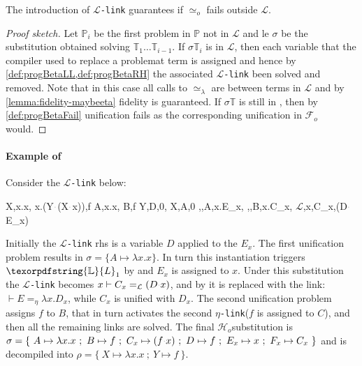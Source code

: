 \documentclass[sigconf,natbib=false,review]{acmart}
\newcommand{\appsep}{\ensuremath{\textcolor{lightgray}{\cdot}}}
\newcommand{\UnifRel}{\ensuremath{\simeq}}
\newcommand{\Uo}{\texorpdfstring{\ensuremath{\UnifRel_o}\xspace}{unif\_o}}
\newcommand{\Ue}{\ensuremath{\UnifRel_\lambda}\xspace}
\newcommand{\llambda}{\ensuremath{\mathcal{L}}\xspace}
\newcommand{\linkMacro}[1]{\ensuremath{#1}\texttt{-link}\xspace}
\newcommand{\linkbeta}{\linkMacro{\llambda}}
\newcommand{\linketa} {\linkMacro{\eta}}
\newcommand{\Fo}{\texorpdfstring{\ensuremath{\mathcal{F}_{\!o}\xspace}}{Fo}} %
\newcommand{\Ho}{\texorpdfstring{\ensuremath{\mathcal{H}_o}\xspace}{Ho}}
\newcommand{\linketaM}[3]{\ensuremath{#1 \vdash #2 =_\eta #3}}
\newcommand{\linkbetaM}[3]{\ensuremath{#1 \vdash #2 =_{\llambda} #3}}
\newcommand{\rhs}{rhs\xspace}
\newcommand{\linkStore}{\texorpdfstring{\ensuremath{\mathbb{L}}\xspace}{L}}
\newcommand{\foUnifPb}{\ensuremath{\mathbb{P}}\xspace}
\newcommand{\hoUnifPb}{\ensuremath{\mathbb{T}}\xspace}
\begin{document}

\begin{theorem}[Fidelity with \linkbeta]
  The introduction of \linkbeta guarantees 
  if \Uo{} fails outside \llambda.
\end{theorem}

\begin{proof}[Proof sketch]
  Let $\foUnifPb_i$ be the first problem in \foUnifPb not in \llambda and
  le $\sigma$ be the substitution obtained solving $\hoUnifPb_1\ldots\hoUnifPb_{i-1}$.
  If $\sigma\hoUnifPb_i$ is in \llambda, then each variable that the
  compiler used to replace a problemat term is assigned and hence
  by \cref{def:progBetaLL,def:progBetaRH} the associated \linkbeta
  been solved and removed. Note that in this case all
  calls to \Ue{} are between terms in \llambda and by \cref{lemma:fidelity-maybeeta}
  fidelity is guaranteed. If $\sigma\hoUnifPb$ is still in \notllambda,
  then by \cref{def:progBetaFail} unification fails as the
  corresponding unification in \Fo{} would.
\end{proof}

\paragraph{Example of \progBetaLL}
Consider the \linkbeta below:

\printAlll
  {{{X,\lambda x.x},
    {\lambda x.(Y\appsep (X\appsep x)),f}}}
  {{{A,\lambda x.x},
    {B,f}}}
  {{{Y,D,0},
    {X,A,0}}}
  {{{\eta,,A,\lambda x.E_{x}},
    {\eta,,B,\lambda x.C_{x}},
    {\llambda,x,C_{x},(D\appsep E_{x})}}}

\noindent
Initially the \linkbeta \rhs is a variable $D$ applied to the $E_x$.
The first unification problem results in $\sigma =
\{A \mapsto \lambda x.x\}$. In turn this instantiation
triggers $\linkStore_1$ by \progressetaleft 
and $E_x$ is assigned to $x$.
Under this substitution the \linkbeta becomes
\linkbetaM{x}{C_x}{(D \appsep x)}, and by \progBetaLL
it is replaced with the link:
\linketaM{}{E}{\lambda x.D_x}, while $C_x$ is unified with $D_x$. The second unification
problem assigns $f$ to $B$, that in turn activates
the second \linketa ($f$ is assigned to $C$), and then all the remaining links
are solved. The final \Ho substitution is $\sigma = \{~A _{} \mapsto \lambda x.x ~;~
B _{} \mapsto f ~;~ C _{x} \mapsto (f\appsep x) ~;~
D _{} \mapsto f ~;~ E _{x} \mapsto x ~;~
F _{x} \mapsto C_{x} ~\}$ and is decompiled into $\rho = \{~X \mapsto \lambda x.x ~;~
Y \mapsto f~\}$.
\end{document}
